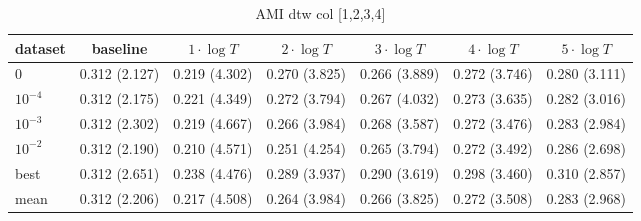     \begin{table}[ht]
    \caption{AMI dtw col [1,2,3,4]} 
    \begin{adjustbox}{width=\textwidth}
    \begin{tabular}{lcccccc}
    \hline
    dataset & baseline & \textbf{$1\cdot \log{T}$} & \textbf{$2\cdot \log{T}$} & \textbf{$3\cdot \log{T}$} & \textbf{$4\cdot \log{T}$} & \textbf{$5\cdot \log{T}$} \\ \hline
    $0$ & 0.312 (2.127) & 0.219 (4.302) & 0.270 (3.825) & 0.266 (3.889) & 0.272 (3.746) & 0.280 (3.111) \\ 
    $10^{-4}$ & 0.312 (2.175) & 0.221 (4.349) & 0.272 (3.794) & 0.267 (4.032) & 0.273 (3.635) & 0.282 (3.016) \\ 
    $10^{-3}$ & 0.312 (2.302) & 0.219 (4.667) & 0.266 (3.984) & 0.268 (3.587) & 0.272 (3.476) & 0.283 (2.984) \\ 
    $10^{-2}$ & 0.312 (2.190) & 0.210 (4.571) & 0.251 (4.254) & 0.265 (3.794) & 0.272 (3.492) & 0.286 (2.698) \\ 
    best & 0.312 (2.651) & 0.238 (4.476) & 0.289 (3.937) & 0.290 (3.619) & 0.298 (3.460) & 0.310 (2.857) \\ 
    mean & 0.312 (2.206) & 0.217 (4.508) & 0.264 (3.984) & 0.266 (3.825) & 0.272 (3.508) & 0.283 (2.968) \\ 
    \hline
    \end{tabular}
    \end{adjustbox}
    \end{table}
    
